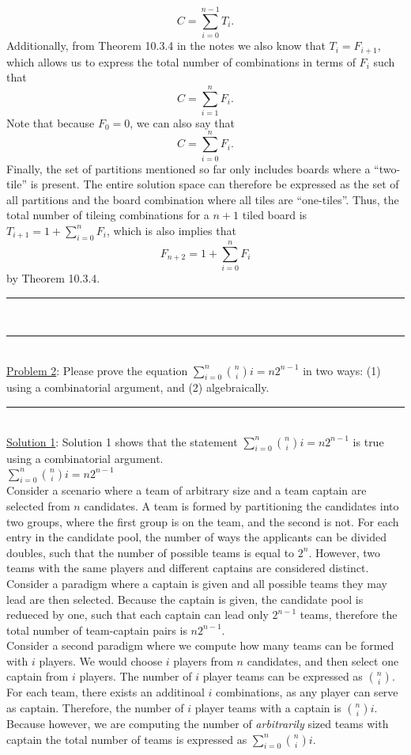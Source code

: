 \documentclass{article}
\newcommand{\problemsep}{\leavevmode\\[0.05in] \rule[\baselineskip/4]{\textwidth}{1pt} \\[0.005in] \rule[\baselineskip]{\textwidth}{1pt}\vspace{-\baselineskip/2}\leavevmode\\[0.05in]}
\newcommand{\statementsep}{\leavevmode\\[0.005in] \rule[\baselineskip/4]{\textwidth}{0.4pt}\leavevmode\\[0.005in]}
\begin{document}
\begin{equation*}
    C = \sum_{i=0}^{n-1}T_i.
\end{equation*}
Additionally, from Theorem 10.3.4 in the notes we also know that $T_i = F_{i+1}$, which allows us to express the total number of combinations in terms of $F_i$ such that
\begin{equation*}
    C = \sum_{i=1}^{n}F_i.
\end{equation*}
Note that because $F_0 = 0$, we can also say that
\begin{equation*}
	C = \sum_{i=0}^nF_i.
\end{equation*}
Finally, the set of partitions mentioned so far only includes boards where a ``two-tile'' is present. The entire solution space can therefore be expressed as the set of all partitions and the board combination where all tiles are ``one-tiles''. Thus, the total number of tileing combinations for a $n + 1$ tiled board is $T_{i+1} = 1 + \sum_{i=0}^nF_i$, which is also implies that
\begin{equation*}
	F_{n+2} = 1 + \sum_{i=0}^nF_i
\end{equation*}
by Theorem 10.3.4.
\problemsep
\noindent\underline{Problem 2}: Please prove the equation $\sum_{i= 0}^n\binom{n}{i}i = n2^{n-1}$ in two ways: (1) using a combinatorial argument, and (2) algebraically.
\statementsep
\noindent\underline{Solution 1}:  Solution 1 shows that the statement $\sum_{i= 0}^n\binom{n}{i}i = n2^{n-1}$ is true using a combinatorial argument.
\\[0.05in]$\sum_{i= 0}^n\binom{n}{i}i = n2^{n-1}$
\\[0.05in] Consider a scenario where a team of arbitrary size and a team captain are selected from $n$ candidates. A team is formed by partitioning the candidates into two groups, where the first group is on the team, and the second is not. For each entry in the candidate pool, the number of ways the applicants can be divided doubles, such that the number of possible teams is equal to $2^n$.  However, two teams with the same players and different captains are considered distinct. 
\\[0.1in] \noindent Consider a paradigm where a captain is given and all possible teams they may lead are then selected. Because the captain is given, the candidate pool is redueced by one, such that each captain can lead only $2^{n-1}$ teams, therefore the total number of team-captain pairs is $n2^{n-1}$.  
\\[0.1in] \noindent Consider a second paradigm where we compute how many teams can be formed with $i$ players. We would choose $i$ players from $n$ candidates, and then select one captain from $i$ players. The number of $i$ player teams can be expressed as $n \choose i$. For each team, there exists an additinoal $i$ combinations, as any player can serve as captain. Therefore, the number of $i$ player teams with a captain is ${n \choose i} i$. Because however, we are computing the number of {\it arbitrarily} sized teams with captain the total number of teams is expressed as $\sum_{i=0}^n {n\choose i}i$.
\end{document}

